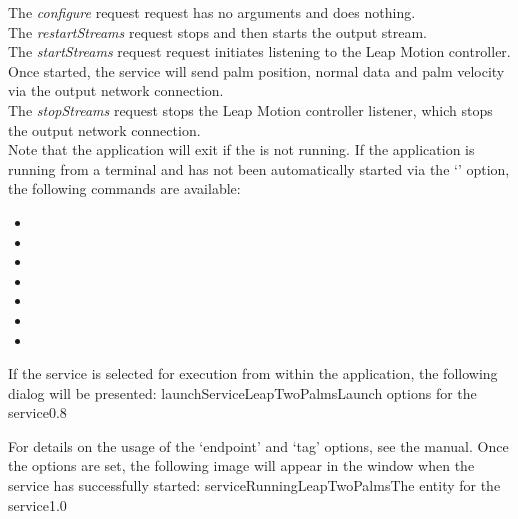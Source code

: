 The \emph{configure} request request has no arguments and does nothing.\\

The \emph{restartStreams} request stops and then starts the output stream.\\

The \emph{startStreams} request request initiates listening to the Leap Motion controller.
Once started, the service will send palm position, normal data and palm velocity via the
output \yarp{} network connection.\\

The \emph{stopStreams} request stops the Leap Motion controller listener, which stops the
output \yarp{} network connection.\\ 

Note that the application will exit if the \emph{\RS} is not running.
\insertAppParameters
\insertTagDescription{\LTPI}
\insertInputServiceComment
\condPage{}
If the application is running from a terminal and has not been automatically started via
the `' option, the following commands are available:
\begin{itemize}
\item{}
\item\exSp{}
\item\exSp{}
\item\exSp{}
\item\exSp{}
\item\exSp{}
\item\exSp{}
\end{itemize}
\secondaryEnd
\condPage
{}
If the service is selected for execution from within the \emph{\MMMU} application, the
following dialog will be presented:
%
{launchServiceLeapTwoPalms}{Launch options for the \emph{\LTPI} service}{0.8}

For details on the usage of the `endpoint' and `tag' options, see the \emph{\MMMU} manual.
Once the options are set, the following image will appear in the \emph{\MMMU} window when
the service has successfully started:
%
{serviceRunningLeapTwoPalms}{The \emph{\MMMU} entity for the \emph{\LTPI} service}{1.0}
\secondaryEnd
\primaryEnd{}
